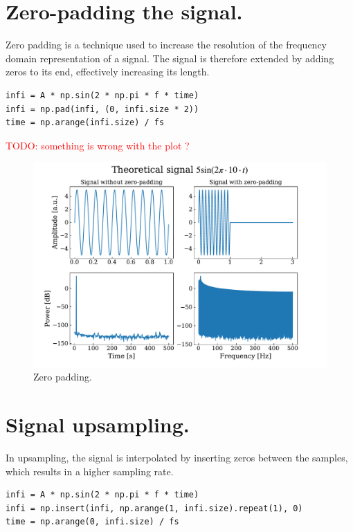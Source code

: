 \documentclass[13pt,a4paper]{article}
\newcommand{\todo}[1]{\textcolor{red}{TODO: #1}}
\begin{document}
\section{Zero-padding the signal.}

Zero padding is a technique used to increase the resolution of the frequency domain representation of a signal. The signal is therefore extended by adding zeros to its end, effectively increasing its length.

\begin{lstlisting}[caption={Code snippet for adding the padding to infinite signal.}]
infi = A * np.sin(2 * np.pi * f * time)
infi = np.pad(infi, (0, infi.size * 2))
time = np.arange(infi.size) / fs
\end{lstlisting}

\todo{something is wrong with the plot ?}
\begin{figure}[ht!]
    \centering
    \includegraphics[width=\linewidth]{zero_pad.pdf}
    \caption{Zero padding.}
    \label{fig:zero_padding}
\end{figure}
\pagebreak


\section{Signal upsampling.}

In upsampling, the signal is interpolated by inserting zeros between the samples, which results in a higher sampling rate.

\begin{lstlisting}[caption={Code snippet for upsampling the signal.}]
infi = A * np.sin(2 * np.pi * f * time)
infi = np.insert(infi, np.arange(1, infi.size).repeat(1), 0)
time = np.arange(0, infi.size) / fs
\end{lstlisting}
\end{document}
